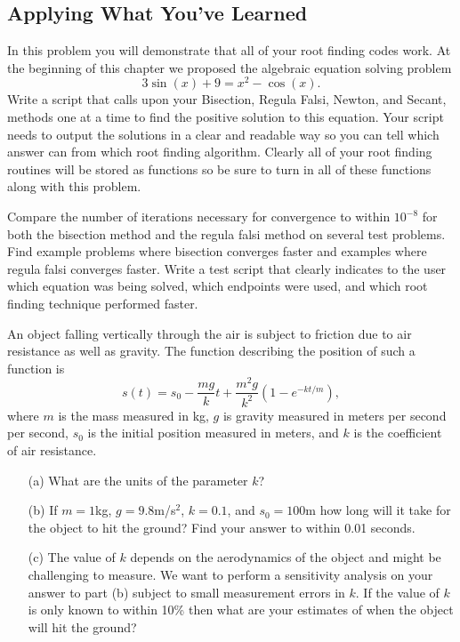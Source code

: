\subsection{Applying What You've Learned}

\begin{problem}
    In this problem you will demonstrate that all of your root finding codes work.
    At the beginning of this chapter we proposed the algebraic equation solving problem
    \[ 3\sin(x) + 9 = x^2 - \cos(x). \]
    Write a \ProgLang script that calls upon your Bisection, Regula Falsi, Newton, and
    Secant, methods one at a time to find the positive solution to this equation.  Your
    script needs to output the solutions in a clear and readable way so you can tell which
    answer can from which root finding algorithm. Clearly all of your root finding
    routines will be stored as \ProgLang functions so be sure to turn in all of these
    functions along with this problem.
\end{problem}



\begin{problem}
    Compare the number of iterations necessary for convergence to within $10^{-8}$ for
    both the bisection method and the regula falsi method on several test problems. Find
    example problems where bisection converges faster and examples where regula falsi
    converges faster. Write a test script that clearly indicates to the user which
    equation was being solved, which endpoints were used, and which root finding technique
    performed faster.
\end{problem}

\begin{problem}
    An object falling vertically through the air is subject to friction due to air
    resistance as well as gravity.  The function describing the position of such a
    function is 
    \[ s(t) = s_0 - \frac{mg}{k} t + \frac{m^2 g}{k^2}\left( 1- e^{-kt/m} \right), \]
    where $m$ is the mass measured in kg, $g$ is gravity measured in meters per second per
    second, $s_0$ is the
    initial position measured in meters, and $k$ is the
    coefficient of air resistance.
    \begin{enumerate}
        \item[(a)] What are the units of the parameter $k$?
        \item[(b)] If $m = 1$kg, $g=9.8$m/s$^2$, $k=0.1$, and $s_0 = 100$m how long will it take
            for the object to hit the ground?  Find your answer to within 0.01 seconds.
        \item[(c)] The value of $k$ depends on the aerodynamics of the object and might be
            challenging to measure.  We want to perform a sensitivity analysis on your
            answer to part (b) subject to small measurement errors in $k$.  If the value
            of $k$ is only known to within 10\% then what are your estimates of when the
            object will hit the ground?
    \end{enumerate}
\end{problem}


